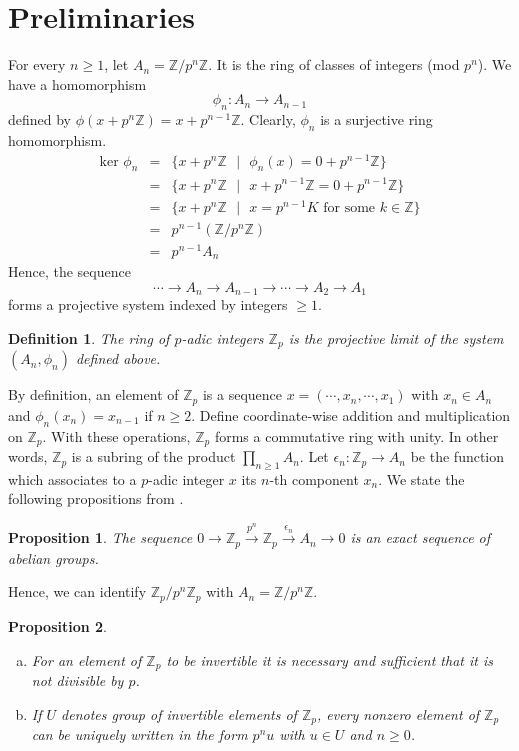 \documentclass[12pt,a4paper]{article}
\newtheorem{dfn}{Definition}[section]
\newtheorem{prop}{Proposition}[section]
\begin{document}
	\section{Preliminaries}\label{Sec Preliminaries}
	For every $n \geq 1$, let $A_n= \mathbb{Z}/p^n\mathbb{Z}$. It is the ring of classes of integers (mod $p^n$). We have a homomorphism $$\phi_n : A_n \rightarrow A_{n-1}$$ defined by $\phi(x+ p^n \mathbb{Z}) = x+p^{n-1} \mathbb{Z}$. Clearly, $\phi_n$ is a surjective ring homomorphism.
	\begin{eqnarray*}
		\mbox{ker }\phi_n &=& \{x +p^n \mathbb{Z} \mbox{ } | \mbox{ }\phi_n(x) = 0+p^{n-1} \mathbb{Z}\} \\
		&=& \{x+p^n \mathbb{Z} \mbox{ }| \mbox{ }x + p^{n-1} \mathbb{Z}=0+p^{n-1} \mathbb{Z}\} \\
		&=& \{x+p^n \mathbb{Z} \mbox{ } | \mbox{ }x= p^{n-1}K \mbox{ for some }k \in \mathbb{Z}\} \\
		&=& p^{n-1} (\mathbb{Z}/p^n\mathbb{Z}) \\
		&=& p^{n-1}A_n
	\end{eqnarray*}
	Hence, the sequence $$\cdots \rightarrow A_n \rightarrow A_{n-1} \rightarrow \cdots \rightarrow A_2 \rightarrow A_1$$ forms a projective system indexed by integers $\geq 1$.
	\begin{dfn}\label{dfn padic integer as a limit of projective system}
		The ring of $p$-adic integers $\mathbb{Z}_p$ is the projective limit of the system $(A_n, \phi_n)$ defined above.
	\end{dfn}
	By definition, an element of $\mathbb{Z}_p$ is a sequence $x=(\cdots,  x_n, \cdots , x_1)$ with $x_n \in A_n$ and $\phi_n(x_n)= x_{n-1}$ if $n \geq 2$. Define coordinate-wise addition and multiplication on $\mathbb{Z}_p$. With these operations, $\mathbb{Z}_p$ forms a commutative ring with unity. In other words, $\mathbb{Z}_p$ is a subring of the product $\prod_{n \geq 1} A_n$.
	Let $\epsilon_n : \mathbb{Z}_p \rightarrow A_n$ be the function which associates to a $p$-adic integer $x$ its $n$-th component $x_n$. We state the following propositions from \cite{JPSerre}.
	\begin{prop}\label{prop exact seq of abelian group}
		The sequence $0 \longrightarrow \mathbb{Z}_p \overset{p^n}{\longrightarrow} \mathbb{Z}_p  \overset{\epsilon_n}{\longrightarrow} A_n \longrightarrow 0 $ is an exact sequence of abelian groups.
	\end{prop}
	Hence, we can identify $\mathbb{Z}_p/p^n\mathbb{Z}_p$ with $A_n= \mathbb{Z}/p^n\mathbb{Z}$.
	\begin{prop}\label{prop units in zp neces and suff}
		\begin{enumerate}[(a)]
			\item For an element of $\mathbb{Z}_p$ to be invertible it is necessary and sufficient that it is not divisible by $p$.
			\item If $U$ denotes group of invertible elements of $\mathbb{Z}_p$, every nonzero element of $\mathbb{Z}_p$ can be uniquely written in the form $p^nu$ with $u \in U$ and $n \geq 0$. 
		\end{enumerate}
	\end{prop}
\end{document}
